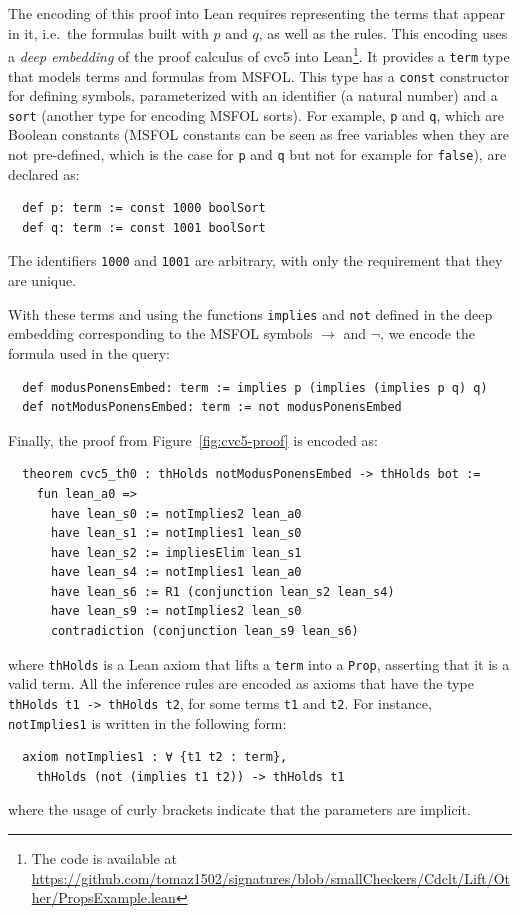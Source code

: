 The encoding of this proof into Lean requires representing the terms that appear
in it, i.e.\ the formulas built with $p$ and $q$, as well as the rules.
%
This encoding uses a \emph{deep embedding} of the proof calculus of cvc5 into
Lean\footnote{The code is available at \url{https://github.com/tomaz1502/signatures/blob/smallCheckers/Cdclt/Lift/Other/PropsExample.lean}}.
%
It provides a \texttt{term} type that models terms and formulas from MSFOL. This type has
a \texttt{const} constructor for defining symbols, parameterized with an
identifier (a natural number) and a \texttt{sort} (another type for encoding MSFOL
sorts).
%
For example, \texttt{p} and \texttt{q}, which are Boolean constants (MSFOL
constants can be seen as free variables when they are not pre-defined, which is
the case for \texttt{p} and \texttt{q} but not for example for \texttt{false}),
are declared as:

\begin{verbatim}
  def p: term := const 1000 boolSort
  def q: term := const 1001 boolSort
\end{verbatim}

The identifiers \texttt{1000} and \texttt{1001} are arbitrary, with only the
requirement that they are unique.

With these terms and using the functions \texttt{implies} and
\texttt{not} defined in the deep embedding corresponding to the MSFOL symbols
$\rightarrow$ and $\neg$, we encode the formula used in the
query:

\begin{verbatim}
  def modusPonensEmbed: term := implies p (implies (implies p q) q)
  def notModusPonensEmbed: term := not modusPonensEmbed
\end{verbatim}

Finally, the proof from Figure~\ref{fig:cvc5-proof} is encoded as:

\begin{verbatim}
  theorem cvc5_th0 : thHolds notModusPonensEmbed -> thHolds bot :=
    fun lean_a0 =>
      have lean_s0 := notImplies2 lean_a0
      have lean_s1 := notImplies1 lean_s0
      have lean_s2 := impliesElim lean_s1
      have lean_s4 := notImplies1 lean_a0
      have lean_s6 := R1 (conjunction lean_s2 lean_s4)
      have lean_s9 := notImplies2 lean_s0
      contradiction (conjunction lean_s9 lean_s6)
\end{verbatim}
where \texttt{thHolds} is a Lean axiom that lifts a \texttt{term} into a \texttt{Prop}, asserting that it is a valid term.
All the inference rules are encoded as axioms that have the type \texttt{thHolds t1 -> thHolds t2}, for some terms \texttt{t1} and \texttt{t2}. For instance, \texttt{notImplies1} is written in the following form:
\begin{verbatim}
  axiom notImplies1 : ∀ {t1 t2 : term},
    thHolds (not (implies t1 t2)) -> thHolds t1
\end{verbatim}
where the usage of curly brackets indicate that the parameters are implicit.

